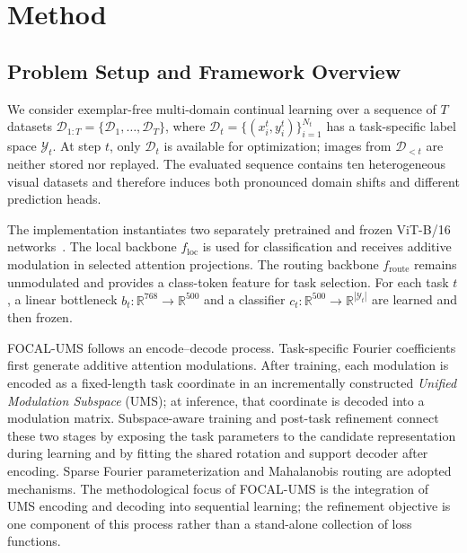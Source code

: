 
\section{Method}
\label{sec:method}

\subsection{Problem Setup and Framework Overview}
\label{sec:setup}

We consider exemplar-free multi-domain continual learning over a sequence of
$T$ datasets
$\mathcal{D}_{1:T}=\{\mathcal{D}_1,\ldots,\mathcal{D}_T\}$, where
$\mathcal{D}_t=\{(x_i^t,y_i^t)\}_{i=1}^{N_t}$ has a task-specific label
space $\mathcal{Y}_t$.  At step $t$, only $\mathcal{D}_t$ is available for
optimization; images from $\mathcal{D}_{<t}$ are neither stored nor replayed.
The evaluated sequence contains ten heterogeneous visual datasets and therefore
induces both pronounced domain shifts and different prediction heads.

The implementation instantiates two separately pretrained and frozen ViT-B/16
networks~\cite{dosovitskiy2021vit}.  The local backbone
$f_{\mathrm{loc}}$ is used for classification and receives additive modulation
in selected attention projections.  The routing backbone $f_{\mathrm{route}}$
remains unmodulated and provides a class-token feature for task selection.  For
each task $t$, a linear bottleneck $b_t:\mathbb{R}^{768}\rightarrow
\mathbb{R}^{500}$ and a classifier
$c_t:\mathbb{R}^{500}\rightarrow\mathbb{R}^{|\mathcal{Y}_t|}$ are learned and
then frozen.

FOCAL-UMS follows an encode--decode process.  Task-specific Fourier
coefficients first generate additive attention modulations.  After training,
each modulation is encoded as a fixed-length task coordinate in an incrementally
constructed \emph{Unified Modulation Subspace} (UMS); at inference, that
coordinate is decoded into a modulation matrix.  Subspace-aware training and
post-task refinement connect these two stages by exposing the task parameters
to the candidate representation during learning and by fitting the shared
rotation and support decoder after encoding.  Sparse Fourier parameterization
and Mahalanobis routing are adopted mechanisms.  The methodological focus of
FOCAL-UMS is the integration of UMS encoding and decoding into sequential
learning; the refinement objective is one component of this process rather than
a stand-alone collection of loss functions.

